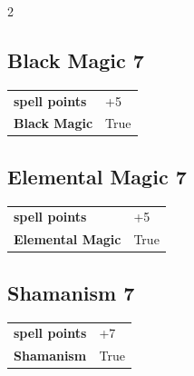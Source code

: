\begin{multicols}{2}
\begin{tcolorbox}
\end{tcolorbox}

\begin{tcolorbox}
    \subsection*{Black Magic \hfill \small{7 }}
    \tcblower




\begin{tabular}{@{}ll@{}}
    \textbf{spell points} & +5\\
    \textbf{Black Magic} & True\\
\end{tabular}


\end{tcolorbox}

\begin{tcolorbox}
    \subsection*{Elemental Magic \hfill \small{7 }}
    \tcblower




\begin{tabular}{@{}ll@{}}
    \textbf{spell points} & +5\\
    \textbf{Elemental Magic} & True\\
\end{tabular}


\end{tcolorbox}

\begin{tcolorbox}
    \subsection*{Shamanism \hfill \small{7 }}
    \tcblower




\begin{tabular}{@{}ll@{}}
    \textbf{spell points} & +7\\
    \textbf{Shamanism} & True\\
\end{tabular}


\end{tcolorbox}
\end{multicols}
